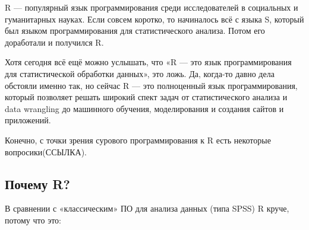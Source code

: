 \documentclass[
  letterpaper,
  DIV=11,
  numbers=noendperiod]{scrreprt}
\theoremstyle{definition}
\theoremstyle{remark}
\begin{document}
R --- популярный язык программирования среди исследователей в социальных
и гуманитарных науках. Если совсем коротко, то начиналось всё с языка S,
который был языком программирования для статистического анализа. Потом
его доработали и получился R.

Хотя сегодня всё ещё можно услышать, что «R --- это язык
программирования для статистической обработки данных», это ложь. Да,
когда-то давно дела обстояли именно так, но сейчас R --- это полноценный
язык программирования, который позволяет решать широкий спект задач от
статистического анализа и data wrangling до машинного обучения,
моделирования и создания сайтов и приложений.

Конечно, с точки зрения сурового программирования к R есть некоторые
вопросики(ССЫЛКА).

\subsection{Почему R?}\label{rbasics-why-r}

В сравнении с «классическим» ПО для анализа данных (типа SPSS) R круче,
потому что это:
\end{document}
